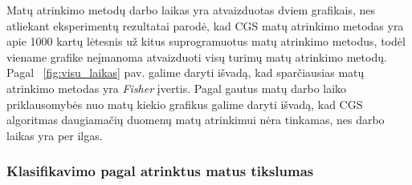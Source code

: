 Matų atrinkimo metodų darbo laikas yra atvaizduotas dviem grafikais, nes atliekant eksperimentų rezultatai parodė, kad CGS matų atrinkimo metodas yra apie 1000 kartų lėtesnis už kitus suprogramuotus matų atrinkimo metodus, todėl viename grafike neįmanoma atvaizduoti visų turimų matų atrinkimo metodų. Pagal ~\ref{fig:visu_laikas} pav. galime daryti išvadą, kad sparčiausias matų atrinkimo metodas yra \textit{Fisher} įvertis. Pagal gautus matų darbo laiko priklausomybės nuo matų kiekio grafikus galime daryti išvadą, kad CGS algoritmas daugiamačių duomenų matų atrinkimui nėra tinkamas, nes darbo laikas yra per ilgas.

\subsubsection{Klasifikavimo pagal atrinktus matus tikslumas}

